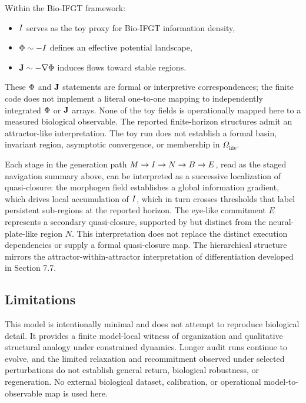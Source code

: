 Within the Bio-IFGT framework:
\begin{itemize}
  \item \(I\) serves as the toy proxy for Bio-IFGT information density,
  \item \(\Phi \sim -I\) defines an effective potential landscape,
  \item \(\mathbf{J} \sim -\nabla \Phi\) induces flows toward stable regions.
\end{itemize}
These \(\Phi\) and \(\mathbf{J}\) statements are formal or interpretive correspondences; the finite code does not implement a literal one-to-one mapping to independently integrated \(\Phi\) or \(\mathbf{J}\) arrays. None of the toy fields is operationally mapped here to a measured biological observable.
The reported finite-horizon structures admit an attractor-like interpretation. The toy run does not establish a formal basin, invariant region, asymptotic convergence, or membership in \(\Omega_{\mathrm{life}}\).

Each stage in the generation path \(M \rightarrow I \rightarrow N \rightarrow B \rightarrow E\), read as the staged navigation summary above, can be interpreted as a successive localization of quasi-closure: the morphogen field establishes a global information gradient, which drives local accumulation of \(I\), which in turn crosses thresholds that label persistent sub-regions at the reported horizon. The eye-like commitment \(E\) represents a secondary quasi-closure, supported by but distinct from the neural-plate-like region \(N\). This interpretation does not replace the distinct execution dependencies or supply a formal quasi-closure map. The hierarchical structure mirrors the attractor-within-attractor interpretation of differentiation developed in Section 7.7.

\subsection{Limitations}

This model is intentionally minimal and does not attempt to reproduce biological detail. It provides a finite model-local witness of organization and qualitative structural analogy under constrained dynamics. Longer audit runs continue to evolve, and the limited relaxation and recommitment observed under selected perturbations do not establish general return, biological robustness, or regeneration. No external biological dataset, calibration, or operational model-to-observable map is used here.
